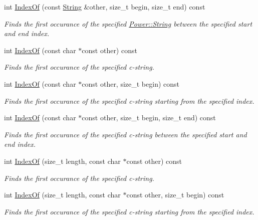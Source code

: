 \begin{DoxyCompactItemize}
int \hyperlink{class_power_1_1_string_a9e204e6e8f98ebbd6db70bfb5312e7ae}{Index\+Of} (const \hyperlink{class_power_1_1_string}{String} \&other, size\+\_\+t begin, size\+\_\+t end) const
\begin{DoxyCompactList}\small\item\em Finds the first occurance of the specified \hyperlink{class_power_1_1_string}{Power\+::\+String} between the specified start and end index. \end{DoxyCompactList}\item 
int \hyperlink{class_power_1_1_string_a431cea53a02daa397a5598138fa0c656}{Index\+Of} (const char $\ast$const other) const
\begin{DoxyCompactList}\small\item\em Finds the first occurance of the specified c-\/string. \end{DoxyCompactList}\item 
int \hyperlink{class_power_1_1_string_a4ddb609f41c44132b4f3214597f32011}{Index\+Of} (const char $\ast$const other, size\+\_\+t begin) const
\begin{DoxyCompactList}\small\item\em Finds the first occurance of the specified c-\/string starting from the specified index. \end{DoxyCompactList}\item 
int \hyperlink{class_power_1_1_string_aba3dd71c9771c992c27c6ee6c81fb802}{Index\+Of} (const char $\ast$const other, size\+\_\+t begin, size\+\_\+t end) const
\begin{DoxyCompactList}\small\item\em Finds the first occurance of the specified c-\/string between the specified start and end index. \end{DoxyCompactList}\item 
int \hyperlink{class_power_1_1_string_a489427963f47ef1ab11dff53218e8fdd}{Index\+Of} (size\+\_\+t length, const char $\ast$const other) const
\begin{DoxyCompactList}\small\item\em Finds the first occurance of the specified c-\/string. \end{DoxyCompactList}\item 
int \hyperlink{class_power_1_1_string_aecff21ff789251b0dcda23a4f2797db2}{Index\+Of} (size\+\_\+t length, const char $\ast$const other, size\+\_\+t begin) const
\begin{DoxyCompactList}\small\item\em Finds the first occurance of the specified c-\/string starting from the specified index. \end{DoxyCompactList}\item 

\end{DoxyCompactItemize}
